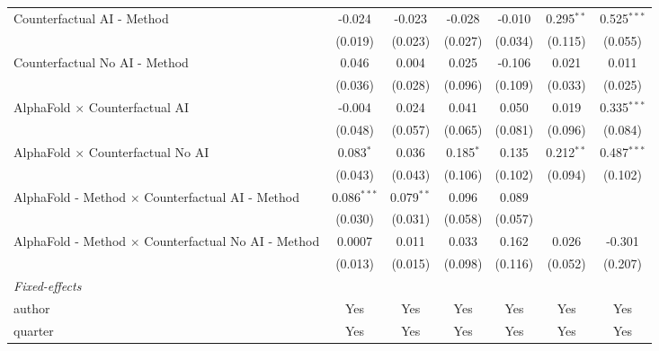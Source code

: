 \begin{tabular}{lcccccc}
   Counterfactual AI - Method                                 & -0.024         & -0.023       & -0.028      & -0.010  & 0.295$^{**}$  & 0.525$^{***}$\\   
                                                              & (0.019)        & (0.023)      & (0.027)     & (0.034) & (0.115)       & (0.055)\\   
   Counterfactual No AI - Method                              & 0.046          & 0.004        & 0.025       & -0.106  & 0.021         & 0.011\\   
                                                              & (0.036)        & (0.028)      & (0.096)     & (0.109) & (0.033)       & (0.025)\\   
   AlphaFold $\times$ Counterfactual AI                       & -0.004         & 0.024        & 0.041       & 0.050   & 0.019         & 0.335$^{***}$\\   
                                                              & (0.048)        & (0.057)      & (0.065)     & (0.081) & (0.096)       & (0.084)\\   
   AlphaFold $\times$ Counterfactual No AI                    & 0.083$^{*}$    & 0.036        & 0.185$^{*}$ & 0.135   & 0.212$^{**}$  & 0.487$^{***}$\\   
                                                              & (0.043)        & (0.043)      & (0.106)     & (0.102) & (0.094)       & (0.102)\\   
   AlphaFold - Method $\times$ Counterfactual AI - Method     & 0.086$^{***}$  & 0.079$^{**}$ & 0.096       & 0.089   &               &   \\   
                                                              & (0.030)        & (0.031)      & (0.058)     & (0.057) &               &   \\   
   AlphaFold - Method $\times$ Counterfactual No AI - Method  & 0.0007         & 0.011        & 0.033       & 0.162   & 0.026         & -0.301\\   
                                                              & (0.013)        & (0.015)      & (0.098)     & (0.116) & (0.052)       & (0.207)\\   
   \midrule
   \emph{Fixed-effects}\\
   author                                                     & Yes            & Yes          & Yes         & Yes     & Yes           & Yes\\  
   quarter                                                    & Yes            & Yes          & Yes         & Yes     & Yes           & Yes\\  

\end{tabular}
